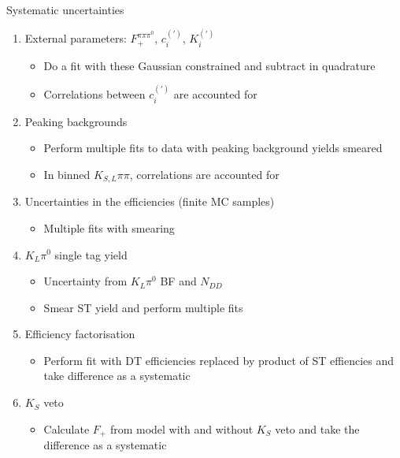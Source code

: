 \documentclass{beamer}
\begin{document}
\begin{frame}{Systematic uncertainties}
  \begin{enumerate}
    \item{External parameters: $F_+^{\pi\pi\pi^0}$, $c_i^{(\prime)}$, $K_i^{(\prime)}$}
    \begin{itemize}
      \item{Do a fit with these Gaussian constrained and subtract in quadrature}
      \item{Correlations between $c_i^{(\prime)}$ are accounted for}
    \end{itemize}
    \item{Peaking backgrounds}
    \begin{itemize}
      \item{Perform multiple fits to data with peaking background yields smeared}
      \item{In binned $K_{S, L}\pi\pi$, correlations are accounted for}
    \end{itemize}
    \item{Uncertainties in the efficiencies (finite MC samples)}
    \begin{itemize}
      \item{Multiple fits with smearing}
    \end{itemize}
    \item{$K_L\pi^0$ single tag yield}
    \begin{itemize}
      \item{Uncertainty from $K_L\pi^0$ BF and $N_{DD}$}
      \item{Smear ST yield and perform multiple fits}
    \end{itemize}
    \item{Efficiency factorisation}
    \begin{itemize}
      \item{Perform fit with DT efficiencies replaced by product of ST effiencies and take difference as a systematic}
    \end{itemize}
    \item{$K_S$ veto}
    \begin{itemize}
      \item{Calculate $F_+$ from model with and without $K_S$ veto and take the difference as a systematic}
    \end{itemize}
  \end{enumerate}
\end{frame}
\end{document}
